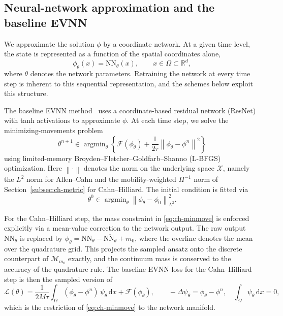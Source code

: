 \documentclass[11pt,letterpaper]{article}
\theoremstyle{plain}
\theoremstyle{definition}
\newcommand{\ph}{\phi}%
\newcommand{\phn}{\phi^n}
\newcommand{\phNN}{\phi_\theta}
\newcommand{\norm}[1]{\left\| #1 \right\|}
\newcommand{\E}{\mathcal{F}}
\newcommand{\X}{\mathcal{X}}
\newcommand{\argmin}{\mathop{\mathrm{argmin}}}
\newcommand{\dd}{\mathrm{d}}
\begin{document}
\subsection{Neural-network approximation and the baseline EVNN}
\label{sec:nn_approximation}

We approximate the solution $\ph$ by a coordinate network. At a given time level, the state is represented as a function of the spatial coordinates alone,
\begin{equation}
\phNN(x) = \mathrm{NN}_\theta(x), \qquad x\in\Omega\subset\mathbb{R}^d,
\end{equation}
where $\theta$ denotes the network parameters. Retraining the network at every time step is inherent to this sequential representation, and the schemes below exploit this structure.

The baseline EVNN method~\cite{Hu2024EVNN} uses a coordinate-based residual network (ResNet) with tanh activations to approximate $\ph$. At each time step, we solve the minimizing-movements problem
\begin{equation}
\theta^{n+1} \in \argmin_\theta \left\{
\E(\phNN) + \frac{1}{2\tau}\norm{\phNN - \phn}^2
\right\}
\end{equation}
using limited-memory Broyden--Fletcher--Goldfarb--Shanno (L-BFGS) optimization. Here $\norm{\cdot}$ denotes the norm on the underlying space $\X$, namely the $L^2$ norm for Allen--Cahn and the mobility-weighted $H^{-1}$ norm of Section~\ref{subsec:ch-metric} for Cahn--Hilliard. The initial condition is fitted via
\begin{equation}
\theta^0 \in \argmin_\theta \norm{\phNN - \ph_0}_{L^2}^2.
\end{equation}

For the Cahn--Hilliard step, the mass constraint in \eqref{eq:ch-minmove} is enforced explicitly via a mean-value correction to the network output. The raw output $\mathrm{NN}_\theta$ is replaced by $\phNN=\mathrm{NN}_\theta - \overline{\mathrm{NN}_\theta} + m_0$, where the overline denotes the mean over the quadrature grid. This projects the sampled ansatz onto the discrete counterpart of $\mathcal{M}_{m_0}$ exactly, and the continuum mass is conserved to the accuracy of the quadrature rule. The baseline EVNN loss for the Cahn--Hilliard step is then the sampled version of
\begin{equation}
\mathcal{L}(\theta)
= \frac{1}{2M\tau}\int_\Omega (\phNN-\phn)\,\psi_\theta\,\dd x + \E(\phNN),
\qquad
-\Delta\psi_\theta = \phNN-\phn,
\quad
\int_\Omega \psi_\theta\,\dd x = 0,
\end{equation}
which is the restriction of \eqref{eq:ch-minmove} to the network manifold. 
\end{document}
